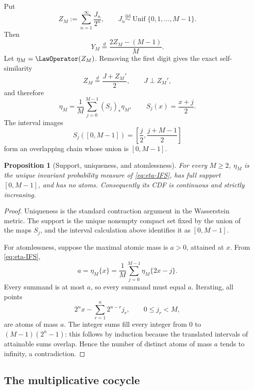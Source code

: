\documentclass[11pt,oneside]{article}
\newtheorem{proposition}[theorem]{Proposition}
\theoremstyle{definition}
\theoremstyle{remark}
\begin{document}
Put
\begin{equation}
 Z_M:=\sum_{n=1}^{\infty}\frac{J_n}{2^n},
 \qquad
 J_n\overset{\mathrm{iid}}\sim\operatorname{Unif}\{0,1,\ldots,M-1\}.
 \label{eq:ZM}
\end{equation}
Then
\begin{equation}
 Y_M\overset d=\frac{2Z_M-(M-1)}{M}.
 \label{eq:Y-Z-affine}
\end{equation}
Let $\eta_M=\LawOperator(Z_M)$.  Removing the first digit gives the exact self-similarity
\begin{equation}
 Z_M\overset d=\frac{J+Z_M'}2,
 \qquad J\perp Z_M',
 \label{eq:Z-IFS-random}
\end{equation}
and therefore
\begin{equation}
 \eta_M=\frac1M\sum_{j=0}^{M-1}(S_j)_*\eta_M,
 \qquad S_j(x)=\frac{x+j}{2}.
 \label{eq:eta-IFS}
\end{equation}
The interval images
\[
 S_j([0,M-1])=\left[\frac j2,\frac{j+M-1}{2}\right]
\]
form an overlapping chain whose union is $[0,M-1]$.

\begin{proposition}[Support, uniqueness, and atomlessness]
\label{prop:support-atomless}
For every $M\ge2$, $\eta_M$ is the unique invariant probability measure of
\eqref{eq:eta-IFS}, has full support $[0,M-1]$, and has no atoms.  Consequently its CDF
is continuous and strictly increasing.
\end{proposition}

\begin{proof}
Uniqueness is the standard contraction argument in the Wasserstein metric.  The support is
the unique nonempty compact set fixed by the union of the maps $S_j$, and the interval
calculation above identifies it as $[0,M-1]$.

For atomlessness, suppose the maximal atomic mass is $a>0$, attained at $x$.  From
\eqref{eq:eta-IFS},
\[
 a=\eta_M\{x\}=\frac1M\sum_{j=0}^{M-1}\eta_M\{2x-j\}.
\]
Every summand is at most $a$, so every summand must equal $a$.  Iterating, all points
\[
 2^n x-\sum_{r=1}^{n}2^{n-r}j_r,
 \qquad 0\le j_r<M,
\]
are atoms of mass $a$.  The integer sums fill every integer from $0$ to
$(M-1)(2^n-1)$: this follows by induction because the translated intervals of attainable
sums overlap.  Hence the number of distinct atoms of mass $a$ tends to infinity, a
contradiction.
\end{proof}

\subsection{The multiplicative cocycle}
\end{document}
